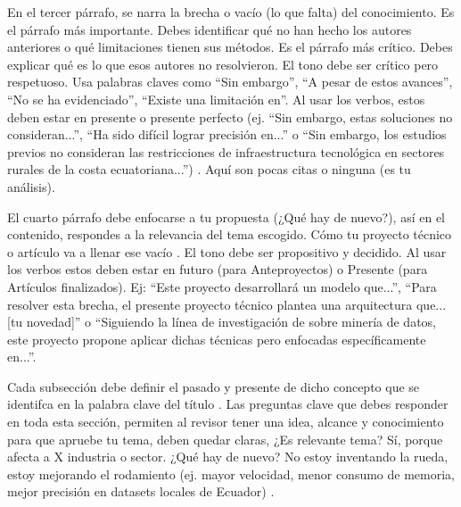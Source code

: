 \documentclass[12pt]{article}
\begin{document}
En el tercer párrafo, se narra la brecha o vacío (lo que falta) del conocimiento. Es el párrafo más importante. Debes identificar qué no han hecho los autores anteriores o qué limitaciones tienen sus métodos. Es el párrafo más crítico. Debes explicar qué es lo que esos autores no resolvieron. El tono debe ser crítico pero respetuoso. Usa palabras claves como ``Sin embargo'', ``A pesar de estos avances'', ``No se ha evidenciado'', ``Existe una limitación en''. Al usar los verbos, estos deben estar en presente o presente perfecto (ej. ``Sin embargo, estas soluciones no consideran...'', ``Ha sido difícil lograr precisión en...'' o ``Sin embargo, los estudios previos no consideran las restricciones de infraestructura tecnológica en sectores rurales de la costa ecuatoriana...'') \parencite{molina2025gestion}. Aquí son pocas citas o ninguna (es tu análisis).

El cuarto párrafo debe enfocarse a tu propuesta (¿Qué hay de nuevo?), así en el contenido, respondes a la relevancia del tema escogido. Cómo tu proyecto técnico o artículo va a llenar ese vacío \parencite{Llerena-Izquierdo2025}. El tono debe ser propositivo y decidido.
Al usar los verbos estos deben estar en futuro (para Anteproyectos) o Presente (para Artículos finalizados). Ej: ``Este proyecto desarrollará un modelo que...'', ``Para resolver esta brecha, el presente proyecto técnico plantea una arquitectura que... [tu novedad]'' o ``Siguiendo la línea de investigación de \textcite{izquierdo2025hacia} sobre minería de datos, este proyecto propone aplicar dichas técnicas pero enfocadas específicamente en...''. 

Cada subsección debe definir el pasado y presente de dicho concepto que se identifca en la palabra clave del título \parencite{Puma-Rodriguez2025}. Las preguntas clave que debes responder en toda esta sección, permiten al revisor tener una idea, alcance y conocimiento para que apruebe tu tema, deben quedar claras, ¿Es relevante tema? Sí, porque afecta a X industria o sector.
¿Qué hay de nuevo? No estoy inventando la rueda, estoy mejorando el rodamiento (ej. mayor velocidad, menor consumo de memoria, mejor precisión en datasets locales de Ecuador) \parencite{10442311,10389227}.
\end{document}
